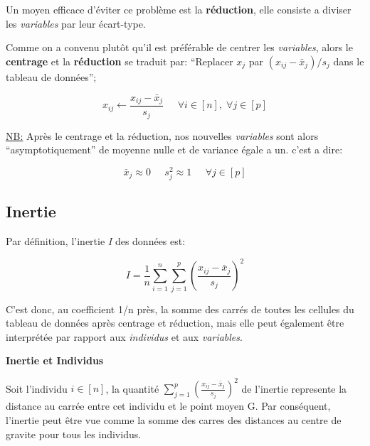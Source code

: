 \documentclass{article}
\begin{document}
Un moyen efficace d'éviter ce problème est la \textbf{réduction}, elle consiste a diviser les \textit{variables} par leur écart-type.
\newline

Comme on a convenu plutôt qu'il est préférable de centrer les \textit{variables}, alors le \textbf{centrage} et la \textbf{réduction} se traduit par: ``Replacer $x_j$ par $(x_{ij}-\bar{x}_j)/s_j$ dans le tableau de données'';

\begin{equation*}
x_{ij} \leftarrow \frac{x_{ij}-\bar{x}_j}{s_j}  \;\;\;\;\; \forall i \in [n], \; \forall j \in [p]
\end{equation*}
\newline

\underline{NB:} Après le centrage et la réduction, nos nouvelles \textit{variables} sont alors ``asymptotiquement'' de moyenne nulle et de variance égale a un. c'est a dire:

\begin{equation*}
\bar{x}_j \approx 0 \;\;\;\;\; s_j^2 \approx 1 \;\;\;\;\; \forall j \in [p]
\end{equation*}

\subsection{Inertie}

Par définition, l'inertie \textit{I} des données est:

\begin{equation*}
I = \frac{1}{n} \sum_{i=1}^n \sum_{j=1}^p {\left( \frac{x_{ij}-\bar{x}_j}{s_j} \right)}^2
\end{equation*}

C'est donc, au coefficient 1/n près, la somme des carrés de toutes les cellules du tableau de données après centrage et réduction, mais elle peut également être interprétée par rapport aux \textit{individus} et aux \textit{variables}.

\newpage

\begin{flushleft}
\textbf{Inertie et Individus}
\end{flushleft}

Soit l'individu $i \in [n]$, la quantité $\sum_{j=1}^p {\left( \frac{x_{ij}-\bar{x}_j}{s_j} \right)}^2$ de l'inertie represente la distance au carrée entre cet individu et le point moyen G. Par conséquent, l’inertie peut être vue comme la somme des carres des distances au centre de gravite pour tous les individus.
\newline
\end{document}
